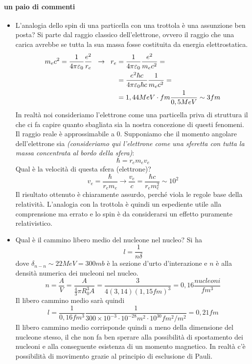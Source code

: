 \paragraph{un paio di commenti}
\begin{itemize}
\item L'analogia dello spin di una particella con una trottola è una assunzione ben posta?
Si parte dal raggio classico dell'elettrone, ovvero il raggio che una carica avrebbe se tutta la sua massa fosse costituita da energia elettrostatica.
\begin{equation}
\begin{split}
m_e c^2=\frac{1}{4\pi\varepsilon_0}\frac{e^2}{r_e}\hspace{0.2cm}\to\hspace{0.2cm}r_e & =\frac{1}{4\pi\varepsilon_0}\frac{e^2}{m_ec^2}=\\
&=\frac{e^2\hbar c}{4\pi \varepsilon_0\hbar c}\frac{1}{m_ec^2}=\\
&=1,44MeV\cdot fm\frac{1}{0,5MeV}\sim 3fm
\end{split}
\end{equation}
In realtà noi consideriamo l'elettrone come una particella priva di struttura il che ci fa capire quanto sbagliata sia la nostra concezione di questi fenomeni. 
Il raggio reale è approssimabile a $0$.
Supponiamo che il momento angolare dell'elettrone sia \emph{(consideriamo qui l'elettrone come una sferetta con tutta la massa concentrata al bordo della sfera)}:
\begin{equation}
\hbar=r_e m_e v_e
\end{equation}
Qual è la velocità di questa sfera (elettrone)?
\begin{equation}
v_e=\frac{\hbar}{r_em_e}\to\frac{v_e}{c}=\frac{\hbar c}{r_em_e^2}\sim 10^2
\end{equation}
Il risultato ottenuto è chiaramente assurdo, perché viola le regole base della relatività. 
L'analogia con la trottola è quindi un espediente utile alla comprensione ma errato e lo spin è da considerarsi un effetto puramente relativistico.
\item Qual è il cammino libero medio del nucleone nel nucleo?
Si ha
\begin{equation}
l=\frac{1}{n\delta}
\end{equation}
dove $\delta_{n-n}\sim 22MeV=300 mb$ è la sezione d'urto d'interazione e $n$ è alla densità numerica dei nucleoni nel nucleo.
\begin{equation}
n=\frac{A}{V}=\frac{A}{\frac{4}{3}\pi R_0^3 A}=\frac{3}{4(3,14)(1,15fm)^3}=0,16\frac{nucleoni}{fm^3}
\end{equation}
Il libero cammino medio sarà quindi
\begin{equation}
l=\frac{1}{0,16fm^3}\frac{1}{300\times 10^{-3}\cdot10^{-28}m^2\cdot 10^{30}fm^2/m^2}=0,21fm
\end{equation}
Il libero cammino medio corrisponde quindi a meno della dimensione del nucleone stesso, il che non fa ben sperare alla possibilità di spostamento dei nucleoni e alla conseguente esistenza di un momento magnetico.
In realtà c'è possibilità di movimento grazie al principio di esclusione di Pauli.
\end{itemize}

